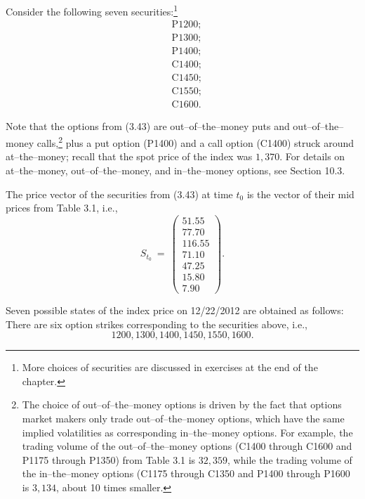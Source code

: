 
Consider the following seven securities:\footnote{More choices of
securities are discussed in exercises at the end of the chapter.}
\begin{equation}
\begin{aligned}
&\text{P1200;} \\
&\text{P1300;} \\
&\text{P1400;} \\
&\text{C1400;} \\
&\text{C1450;} \\
&\text{C1550;} \\
&\text{C1600.}
\end{aligned}
\end{equation}

Note that the options from (3.43) are out--of--the--money puts and
out--of--the--money calls,\footnote{The choice of out--of--the--money
options is driven by the fact that options market makers only trade
out--of--the--money options, which have the same implied volatilities as
corresponding in--the--money options. For example, the trading volume of
the out--of--the--money options (C1400 through C1600 and P1175 through
P1350) from Table 3.1 is $32,359$, while the trading volume of the
in--the--money options (C1175 through C1350 and P1400 through P1600 is
$3,134$, about 10 times smaller.} plus a put option (P1400) and a call
option (C1400) struck around at--the--money; recall that the spot price
of the index was $1,370$. For details on at--the--money,
out--of--the--money, and in--the--money options, see Section 10.3.

The price vector of the securities from (3.43) at time $t_0$ is the
vector of their mid prices from Table 3.1, i.e.,
\begin{equation}
S_{t_0} \ = \ \begin{pmatrix} 51.55 \\ 77.70 \\ 116.55 \\ 71.10 \\ 47.25 \\ 15.80 \\ 7.90 \end{pmatrix}.
\end{equation}

Seven possible states of the index price on 12/22/2012 are obtained as
follows: There are six option strikes corresponding to the securities
above, i.e.,
\[
1200, 1300, 1400, 1450, 1550, 1600.
\]

